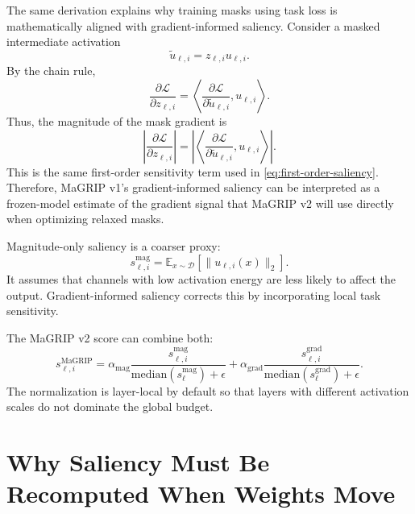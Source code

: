 \documentclass[11pt]{article}
\newcommand{\E}{\mathbb{E}}
\newcommand{\Loss}{\mathcal{L}}
\newcommand{\Data}{\mathcal{D}}
\begin{document}
The same derivation explains why training masks using task loss is mathematically aligned with gradient-informed saliency. Consider a masked intermediate activation
\begin{equation}
  \widetilde{u}_{\ell,i}
  =
  z_{\ell,i}u_{\ell,i}.
\end{equation}
By the chain rule,
\begin{equation}
  \frac{\partial \Loss}{\partial z_{\ell,i}}
  =
  \left\langle
    \frac{\partial \Loss}{\partial \widetilde{u}_{\ell,i}},
    u_{\ell,i}
  \right\rangle.
  \label{eq:mask-gradient}
\end{equation}
Thus, the magnitude of the mask gradient is
\begin{equation}
  \left|
  \frac{\partial \Loss}{\partial z_{\ell,i}}
  \right|
  =
  \left|
  \left\langle
    \frac{\partial \Loss}{\partial \widetilde{u}_{\ell,i}},
    u_{\ell,i}
  \right\rangle
  \right|.
\end{equation}
This is the same first-order sensitivity term used in \eqref{eq:first-order-saliency}. Therefore, MaGRIP v1's gradient-informed saliency can be interpreted as a frozen-model estimate of the gradient signal that MaGRIP v2 will use directly when optimizing relaxed masks.

Magnitude-only saliency is a coarser proxy:
\begin{equation}
  s_{\ell,i}^{\mathrm{mag}}
  =
  \E_{x\sim\Data}
  \left[
    \|u_{\ell,i}(x)\|_2
  \right].
  \label{eq:magnitude-saliency}
\end{equation}
It assumes that channels with low activation energy are less likely to affect the output. Gradient-informed saliency corrects this by incorporating local task sensitivity.

The MaGRIP v2 score can combine both:
\begin{equation}
  s_{\ell,i}^{\mathrm{MaGRIP}}
  =
  \alpha_{\mathrm{mag}}
  \frac{s_{\ell,i}^{\mathrm{mag}}}{\mathrm{median}(s_{\ell}^{\mathrm{mag}})+\epsilon}
  +
  \alpha_{\mathrm{grad}}
  \frac{s_{\ell,i}^{\mathrm{grad}}}{\mathrm{median}(s_{\ell}^{\mathrm{grad}})+\epsilon}.
  \label{eq:magrip-score}
\end{equation}
The normalization is layer-local by default so that layers with different activation scales do not dominate the global budget.

\section{Why Saliency Must Be Recomputed When Weights Move}
\end{document}
